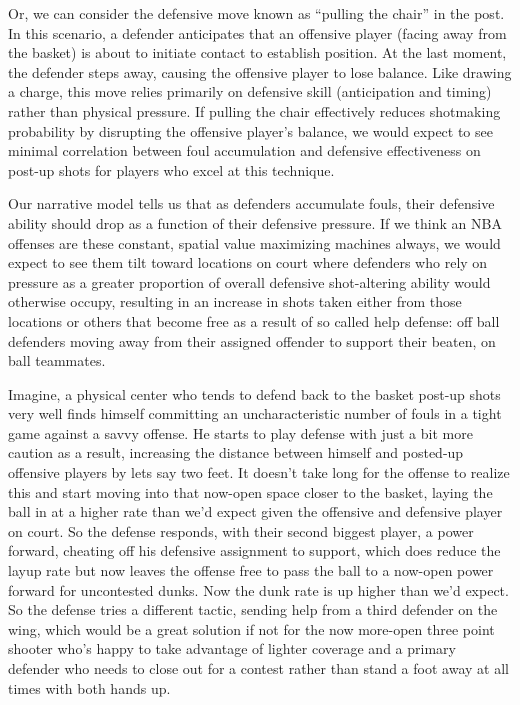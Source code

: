 \documentclass[
  letterpaper,
  DIV=11,
  numbers=noendperiod]{scrartcl}
\begin{document}
Or, we can consider the defensive move known as ``pulling the chair'' in
the post. In this scenario, a defender anticipates that an offensive
player (facing away from the basket) is about to initiate contact to
establish position. At the last moment, the defender steps away, causing
the offensive player to lose balance. Like drawing a charge, this move
relies primarily on defensive skill (anticipation and timing) rather
than physical pressure. If pulling the chair effectively reduces
shotmaking probability by disrupting the offensive player's balance, we
would expect to see minimal correlation between foul accumulation and
defensive effectiveness on post-up shots for players who excel at this
technique.

Our narrative model tells us that as defenders accumulate fouls, their
defensive ability should drop as a function of their defensive pressure.
If we think an NBA offenses are these constant, spatial value maximizing
machines always, we would expect to see them tilt toward locations on
court where defenders who rely on pressure as a greater proportion of
overall defensive shot-altering ability would otherwise occupy,
resulting in an increase in shots taken either from those locations or
others that become free as a result of so called help defense: off ball
defenders moving away from their assigned offender to support their
beaten, on ball teammates.

Imagine, a physical center who tends to defend back to the basket
post-up shots very well finds himself committing an uncharacteristic
number of fouls in a tight game against a savvy offense. He starts to
play defense with just a bit more caution as a result, increasing the
distance between himself and posted-up offensive players by lets say two
feet. It doesn't take long for the offense to realize this and start
moving into that now-open space closer to the basket, laying the ball in
at a higher rate than we'd expect given the offensive and defensive
player on court. So the defense responds, with their second biggest
player, a power forward, cheating off his defensive assignment to
support, which does reduce the layup rate but now leaves the offense
free to pass the ball to a now-open power forward for uncontested dunks.
Now the dunk rate is up higher than we'd expect. So the defense tries a
different tactic, sending help from a third defender on the wing, which
would be a great solution if not for the now more-open three point
shooter who's happy to take advantage of lighter coverage and a primary
defender who needs to close out for a contest rather than stand a foot
away at all times with both hands up.
\end{document}

